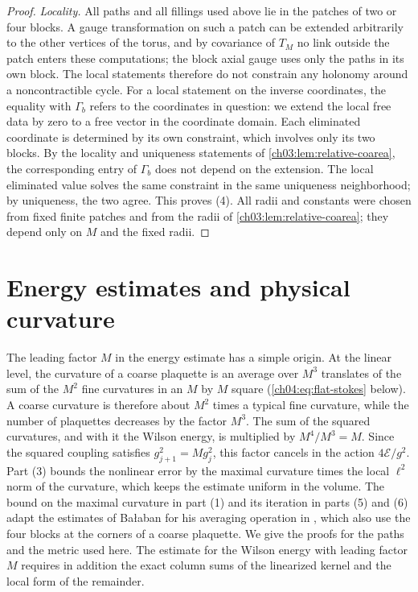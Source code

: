 \begin{proof}
\emph{Locality.} All paths and all fillings used above lie in the patches of two or four blocks. A gauge transformation on such a patch can be extended arbitrarily to the other vertices of the torus, and by covariance of $T_M$ no link outside the patch enters these computations; the block axial gauge uses only the paths in its own block. The local statements therefore do not constrain any holonomy around a noncontractible cycle. For a local statement on the inverse coordinates, the equality with $\Gamma_b$ refers to the coordinates in question: we extend the local free data by zero to a free vector in the coordinate domain. Each eliminated coordinate is determined by its own constraint, which involves only its two blocks. By the locality and uniqueness statements of \cref{ch03:lem:relative-coarea}, the corresponding entry of $\Gamma_b$ does not depend on the extension. The local eliminated value solves the same constraint in the same uniqueness neighborhood; by uniqueness, the two agree. This proves (4). All radii and constants were chosen from fixed finite patches and from the radii of \cref{ch03:lem:relative-coarea}; they depend only on $M$ and the fixed radii.
\end{proof}

\section{Energy estimates and physical curvature}\label{ch04:sec:energy}

The leading factor $M$ in the energy estimate has a simple origin. At the linear level, the curvature of a coarse plaquette is an average over $M^3$ translates of the sum of the $M^2$ fine curvatures in an $M$ by $M$ square (\eqref{ch04:eq:flat-stokes} below). A coarse curvature is therefore about $M^2$ times a typical fine curvature, while the number of plaquettes decreases by the factor $M^3$. The sum of the squared curvatures, and with it the Wilson energy, is multiplied by $M^4/M^3=M$. Since the squared coupling satisfies $g_{j+1}^2=Mg_j^2$, this factor cancels in the action $4\mathscr E/g^2$. Part (3) bounds the nonlinear error by the maximal curvature times the local $\ell^2$ norm of the curvature, which keeps the estimate uniform in the volume. The bound on the maximal curvature in part (1) and its iteration in parts (5) and (6) adapt the estimates of Bałaban for his averaging operation in \cite[Section~B, Propositions~1 and~2]{Balaban1985Averaging}, which also use the four blocks at the corners of a coarse plaquette. We give the proofs for the paths and the metric used here. The estimate for the Wilson energy with leading factor $M$ requires in addition the exact column sums of the linearized kernel and the local form of the remainder.

